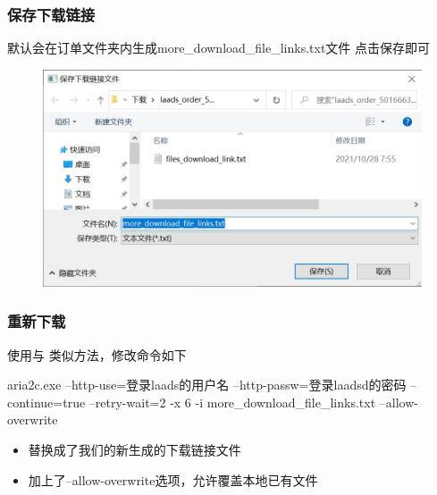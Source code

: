 \begin{frame}
    \frametitle{保存下载链接}
    默认会在订单文件夹内生成more\_download\_file\_links.txt文件
    点击保存即可
    \begin{figure}
        \includegraphics[width=0.8\linewidth]{images/3.13保存重新下载文件的链接}
    \end{figure}
\end{frame}

\begin{frame}
    \frametitle{重新下载}
使用与 \hyperlink{aria2-cmd}{} 类似方法，修改命令如下

aria2c.exe --http-use=登录laads的用户名 --http-passw=登录laadsd的密码
    --continue=true --retry-wait=2 -x 6 -i more\_download\_file\_links.txt
    --allow-overwrite

\begin{itemize}
    \item 替换成了我们的新生成的下载链接文件
    \item 加上了--allow-overwrite选项，允许覆盖本地已有文件
\end{itemize}
\end{frame}


